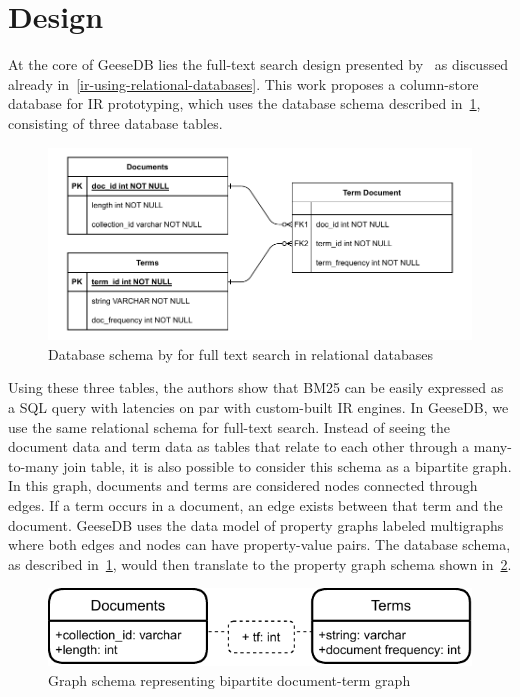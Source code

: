 \section{Design}
At the core of GeeseDB lies the full-text search design presented by~\citet{OldDog} as discussed already in~\cref{ir-using-relational-databases}. This work proposes a column-store database for IR prototyping, which uses the database schema described in~\cref{olddog_schema}, consisting of three database tables.
\begin{figure}
	\centering
	\includegraphics[width=\linewidth]{./imgs/olddog-schema-3.pdf}
	\caption{Database schema by \citeauthor{OldDog} for full text search in relational databases}
	\label{olddog_schema}
\end{figure}
Using these three tables, the authors show that BM25 can be easily expressed as a SQL query with latencies on par with custom-built IR engines. In GeeseDB, we use the same relational schema for full-text search.
Instead of seeing the document data and term data as tables that relate to each other through a many-to-many join table, it is also possible to consider this schema as a bipartite graph. In this graph, documents and terms are considered nodes connected through edges. If a term occurs in a document, an edge exists between that term and the document. GeeseDB uses the data model of property graphs labeled multigraphs where both edges and nodes can have property-value pairs. The database schema, as described in~\cref{olddog_schema}, would then translate to the property graph schema shown in~\cref{olddog-graph-schema}.
\begin{figure}
	\centering
	\includegraphics[width=\linewidth]{./imgs/olddog-graph-schema.pdf}
	\caption{Graph schema representing bipartite document-term graph}
	\label{olddog-graph-schema}
\end{figure}
